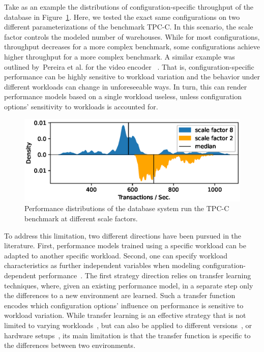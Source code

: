 {\color{edited}
Take as an example the distributions of configuration-specific throughput of the database \htwo in Figure~\ref{fig:h2_intro}. Here, we tested the exact same configurations on two different parameterizations of the benchmark \textsf{TPC-C}. In this scenario, the scale factor controls the modeled number of warehouses. While for most configurations, throughput decreases for a more complex benchmark, some configurations achieve higher throughput for a more complex benchmark. A similar example was outlined by~Pereira et al. for the video encoder \xzwo~\cite{alves_sampling_2020}. That is, configuration-specific performance can be highly sensitive to workload variation and the behavior under different workloads can change in unforeseeable ways. In turn, this can render performance models based on a single workload useless, unless configuration options’ sensitivity to workloads is accounted for.
}
\begin{figure}
	\centering
	\includegraphics[width=0.99\linewidth]{images/h2_motivation.eps}
	\caption{Performance distributions of the database system \htwo run the \textsf{TPC-C} benchmark at different scale factors.}
	\label{fig:h2_intro}
\end{figure}

To address this limitation, two different directions have been pursued in the literature. First, performance models trained using a specific workload can be adapted to another specific workload. Second,  one can specify workload characteristics as further independent variables when modeling configuration-dependent performance~\cite{koc_satune_2021}.
The first strategy direction relies on transfer learning techniques, where, given an existing performance model, in a separate step only the differences to a new environment are learned. Such a transfer function encodes which configuration options’ influence on performance is sensitive to workload variation. While transfer learning is an effective strategy that is not limited to varying workloads~\cite{jamshidi_learning_2018}, but can also be applied to different versions~\cite{jamishidi_transfer_2017,jamshidi_transfer_gp_2017,martin_transfer_2021}, or hardware setups~\cite{ding_bayesian_2020}, its main limitation is that the transfer function is specific to the differences between two environments.



